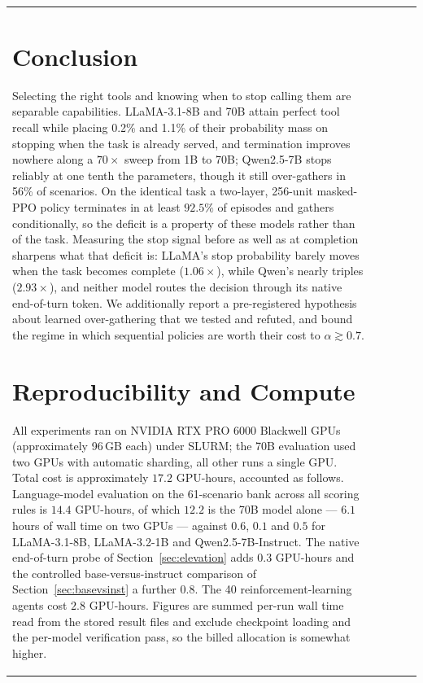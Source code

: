 \documentclass[11pt]{article}
\begin{document}
\begin{table}[t]
\begin{tabular}{lcccc}
\section{Conclusion}

Selecting the right tools and knowing when to stop calling them are separable
capabilities. LLaMA-3.1-8B and 70B attain perfect tool recall while placing
0.2\% and 1.1\% of their probability mass on stopping when the task is already
served, and termination improves nowhere along a $70\times$ sweep from 1B to 70B;
Qwen2.5-7B stops reliably at one tenth the parameters, though it still
over-gathers in 56\% of scenarios. On the identical task a two-layer, 256-unit
masked-PPO policy terminates in at least $92.5\%$ of episodes and gathers
conditionally, so the deficit is a property of these models rather than of the
task. Measuring the stop signal before as well as at completion sharpens what
that deficit is: LLaMA's stop probability barely moves when the task becomes
complete ($1.06\times$), while Qwen's nearly triples ($2.93\times$), and neither
model routes the decision through its native end-of-turn token. We additionally report a pre-registered hypothesis about learned
over-gathering that we tested and refuted, and bound the regime in which
sequential policies are worth their cost to $\alpha \gtrsim 0.7$.

\section*{Reproducibility and Compute}

All experiments ran on NVIDIA RTX PRO 6000 Blackwell GPUs (approximately
96\,GB each) under SLURM; the 70B evaluation used two GPUs with automatic
sharding, all other runs a single GPU. Total cost is approximately $17.2$
GPU-hours, accounted as follows. Language-model evaluation on the 61-scenario bank
across all scoring rules is $14.4$ GPU-hours, of which $12.2$ is the 70B model
alone --- $6.1$ hours of wall time on two GPUs --- against $0.6$, $0.1$ and $0.5$
for LLaMA-3.1-8B, LLaMA-3.2-1B and Qwen2.5-7B-Instruct. The native end-of-turn
probe of Section~\ref{sec:elevation} adds $0.3$ GPU-hours and the controlled
base-versus-instruct comparison of Section~\ref{sec:basevsinst} a further $0.8$.
The 40 reinforcement-learning agents cost $2.8$ GPU-hours. Figures are summed
per-run wall time read from the stored result files and exclude checkpoint loading
and the per-model verification pass, so the billed allocation is somewhat higher.


\end{tabular}
\end{table}
\end{document}
